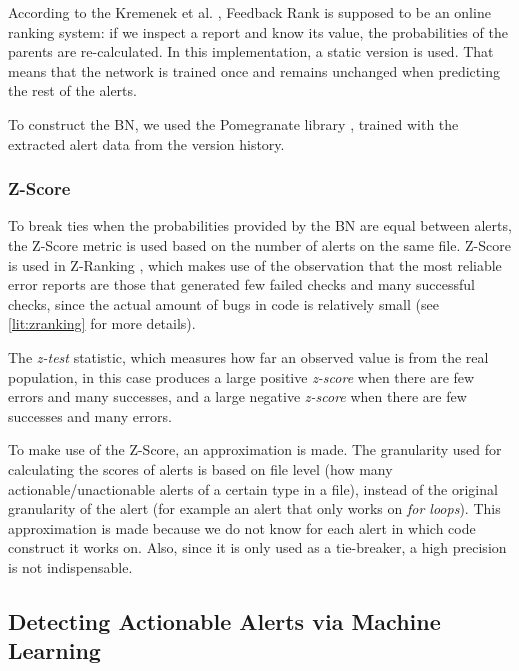 According to the Kremenek et al. \cite{correlation_exploitation}, Feedback Rank is supposed to be an online ranking system: if we inspect a report and know its value, the probabilities of the parents are re-calculated. In this implementation, a static version is used. That means that the network is trained once and remains unchanged when predicting the rest of the alerts.

To construct the BN, we used the Pomegranate library \cite{pomegranate}, trained with the extracted alert data from the version history. 

\subsubsection{Z-Score}

To break ties when the probabilities provided by the BN are equal between alerts, the Z-Score metric is used based on the number of alerts on the same file. Z-Score is used in Z-Ranking \cite{z-ranking}, which makes use of the observation that the most reliable error reports are those that generated few failed checks and many successful checks, since the actual amount of bugs in code is relatively small (see \cref{lit:zranking} for more details). 

The \textit{z-test} statistic, which measures how far an observed value is from the real population, in this case produces a large positive \textit{z-score} when there are few errors and many successes, and a large negative \textit{z-score} when there are few successes and many errors.

To make use of the Z-Score, an approximation is made. The granularity used for calculating the scores of alerts is based on file level (how many actionable/unactionable alerts of a certain type in a file), instead of the original granularity of the alert (for example an alert that only works on \textit{for loops}). This approximation is made because we do not know for each alert in which code construct it works on. Also, since it is only used as a tie-breaker, a high precision is not indispensable.

\subsection{Detecting Actionable Alerts via Machine Learning}
\label{method:actalerts}

